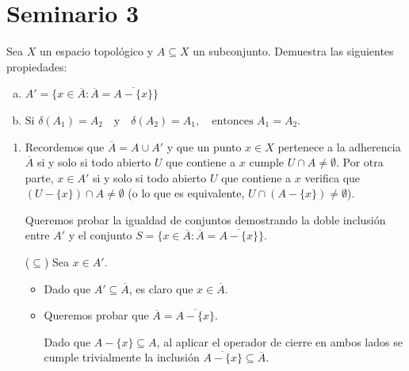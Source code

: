 \section{Seminario 3}
\begin{ejer}
    [49 a),b)] Sea $X$ un espacio topológico y $A \subseteq X$ un subconjunto. Demuestra las siguientes propiedades:
    \begin{enumerate}[a)]
        \item $A' = \{x \in \overline{A} : \overline{A} = \overline{A - \{x\}}\}$
    \item $ \text{Si } \delta(A_1) = A_2 \quad \text{y} \quad \delta(A_2) = A_1, \quad \text{entonces } A_1 = A_2.$
    \end{enumerate}
    
\end{ejer}
\begin{sol}
    \begin{enumerate}
    \item[a)] Recordemos que $\overline{A} = A \cup A'$ y que un punto $x \in X$ pertenece a la adherencia $\overline{A}$ si y solo si todo abierto $U$ que contiene a $x$ cumple $U \cap A \neq \emptyset$. Por otra parte, $x \in A'$ si y solo si todo abierto $U$ que contiene a $x$ verifica que $(U - \{x\}) \cap A \neq \emptyset$ (o lo que es equivalente, $U \cap (A - \{x\}) \neq \emptyset$).

    Queremos probar la igualdad de conjuntos demostrando la doble inclusión entre $A'$ y el conjunto $S = \{x \in \overline{A} : \overline{A} = \overline{A - \{x\}}\}$.

    \medskip

   ($\subseteq$) Sea $x \in A'$.
    \begin{itemize}
        \item Dado que $A' \subseteq \overline{A}$, es claro que $x \in \overline{A}$.
        \item Queremos probar que $\overline{A} = \overline{A - \{x\}}$. 
        
        Dado que $A - \{x\} \subseteq A$, al aplicar el operador de cierre en ambos lados se cumple trivialmente la inclusión $\overline{A - \{x\}} \subseteq \overline{A}$.


\end{itemize}
\end{enumerate}
\end{sol}
